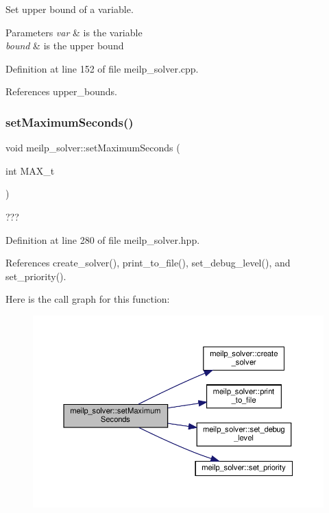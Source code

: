 Set upper bound of a variable. 


\begin{DoxyParams}{Parameters}
{\em var} & is the variable \\
\hline
{\em bound} & is the upper bound \\
\hline
\end{DoxyParams}


Definition at line 152 of file meilp\+\_\+solver.\+cpp.



References upper\+\_\+bounds.

\mbox{\label{classmeilp__solver_a4ef0f57f14ac9ce9707f617310635e55}} 
\subsubsection{\texorpdfstring{set\+Maximum\+Seconds()}{setMaximumSeconds()}}
{\footnotesize\ttfamily void meilp\+\_\+solver\+::set\+Maximum\+Seconds (\begin{DoxyParamCaption}\item[{int}]{M\+A\+X\+\_\+t }\end{DoxyParamCaption})\hspace{0.3cm}{\ttfamily [inline]}}



??? 



Definition at line 280 of file meilp\+\_\+solver.\+hpp.



References create\+\_\+solver(), print\+\_\+to\+\_\+file(), set\+\_\+debug\+\_\+level(), and set\+\_\+priority().

Here is the call graph for this function\+:
\nopagebreak
\begin{figure}[H]
\begin{center}
\leavevmode
\includegraphics[width=350pt]{dc/d7f/classmeilp__solver_a4ef0f57f14ac9ce9707f617310635e55_cgraph}
\end{center}
\end{figure}
\mbox{\label{classmeilp__solver_ac042de10d65f792cc6ef6020b8451837}} 
